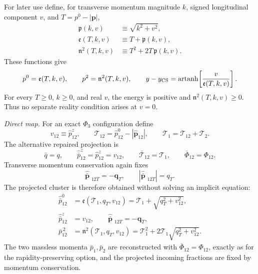 \documentclass[11pt]{article}
\newcommand{\Ph}{\Phi}
\begin{document}
For later use define, for transverse momentum magnitude $k$, signed longitudinal component $v$, and
$T=p^0-|\boldsymbol p|$,
\begin{align}
\mathfrak p(k,v)
&\equiv
\sqrt{k^2+v^2},
\label{eq:isrfsr-zrepair-p-function}
\\
\mathfrak e(T,k,v)
&\equiv
T+\mathfrak p(k,v),
\label{eq:isrfsr-zrepair-energy-function}
\\
\mathfrak n^2(T,k,v)
&\equiv
T^2+2T\,\mathfrak p(k,v).
\label{eq:isrfsr-zrepair-mass-function}
\end{align}
These functions give
\begin{equation}
p^0=\mathfrak e(T,k,v),
\qquad
p^2=\mathfrak n^2(T,k,v),
\qquad
y-y_{\rm CS}
=
\operatorname{artanh}\!
\left[
\frac{v}{\mathfrak e(T,k,v)}
\right].
\label{eq:isrfsr-zrepair-kinematic-inversion}
\end{equation}
For every $T\ge0$, $k\ge0$, and real $v$, the energy is positive and
$\mathfrak n^2(T,k,v)\ge0$.  Thus no separate reality condition arises at $v=0$.

\medskip
\noindent
\textit{Direct map.}
For an exact $\Ph_3$ configuration define
\begin{equation}
v_{12}\equiv\hat p_{12}^z,
\qquad
\mathcal T_{12}
=
\hat p_{12}^0-|\hat{\boldsymbol p}_{12}|,
\qquad
\mathcal T_1=\mathcal T_{12}+\mathcal T_2.
\label{eq:isrfsr-zrepair-direct-inputs}
\end{equation}
The alternative repaired projection is
\begin{equation}
\boxed{
\bar q=q,
\qquad
\hat{\bar p}_{12}^z=\hat p_{12}^z=v_{12},
\qquad
\bar{\mathcal T}_{12}=\mathcal T_1,
\qquad
\bar\Phi_{12}=\Phi_{12}
}.
\label{eq:isrfsr-zrepair-direct-map}
\end{equation}
Transverse momentum conservation again fixes
\begin{equation}
\hat{\boldsymbol{\bar p}}_{\ \, 12T}=-\boldsymbol q_T,
\qquad
|\hat{\boldsymbol{\bar p}}_{\ \, 12T}|=q_T.
\label{eq:isrfsr-zrepair-projected-pt}
\end{equation}
The projected cluster is therefore obtained without solving an implicit equation:
\begin{align}
\hat{\bar p}_{12}^0
&=
\mathfrak e(\mathcal T_1,q_T,v_{12})
=
\mathcal T_1+\sqrt{q_T^2+v_{12}^2},
\nonumber\\
\hat{\bar p}_{12}^z
&=v_{12},
\qquad
\hat{\boldsymbol{\bar p}}_{\ \, 12T}=-\boldsymbol q_T,
\label{eq:isrfsr-zrepair-projected-components}
\\
\bar p_{12}^{\,2}
&=
\boxed{
\mathfrak n^2(\mathcal T_1,q_T,v_{12})
=
\mathcal T_1^2
+2\mathcal T_1\sqrt{q_T^2+v_{12}^2}
}.
\label{eq:isrfsr-zrepair-projected-mass}
\end{align}
The two massless momenta $\bar p_1,\bar p_2$ are reconstructed with
$\bar\Phi_{12}=\Phi_{12}$, exactly as for the rapidity-preserving option, and the projected incoming fractions
are fixed by momentum conservation.
\end{document}
